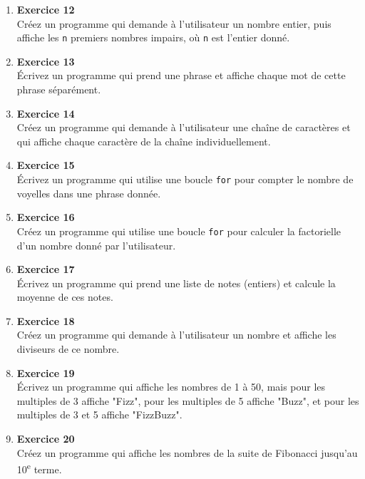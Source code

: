 \documentclass{article}
\begin{document}
\begin{enumerate}
    \item \textbf{Exercice 12} \\
    Créez un programme qui demande à l'utilisateur un nombre entier, puis affiche les \texttt{n} premiers nombres impairs, où \texttt{n} est l'entier donné.

    \item \textbf{Exercice 13} \\
    Écrivez un programme qui prend une phrase et affiche chaque mot de cette phrase séparément.

    \item \textbf{Exercice 14} \\
    Créez un programme qui demande à l'utilisateur une chaîne de caractères et qui affiche chaque caractère de la chaîne individuellement.

    \item \textbf{Exercice 15} \\
    Écrivez un programme qui utilise une boucle \texttt{for} pour compter le nombre de voyelles dans une phrase donnée.

    \item \textbf{Exercice 16} \\
    Créez un programme qui utilise une boucle \texttt{for} pour calculer la factorielle d'un nombre donné par l'utilisateur.

    \item \textbf{Exercice 17} \\
    Écrivez un programme qui prend une liste de notes (entiers) et calcule la moyenne de ces notes.

    \item \textbf{Exercice 18} \\
    Créez un programme qui demande à l'utilisateur un nombre et affiche les diviseurs de ce nombre.

    \item \textbf{Exercice 19} \\
    Écrivez un programme qui affiche les nombres de 1 à 50, mais pour les multiples de 3 affiche "Fizz", pour les multiples de 5 affiche "Buzz", et pour les multiples de 3 et 5 affiche "FizzBuzz".

    \item \textbf{Exercice 20} \\
    Créez un programme qui affiche les nombres de la suite de Fibonacci jusqu'au 10\textsuperscript{e} terme.

\end{enumerate}
\end{document}

